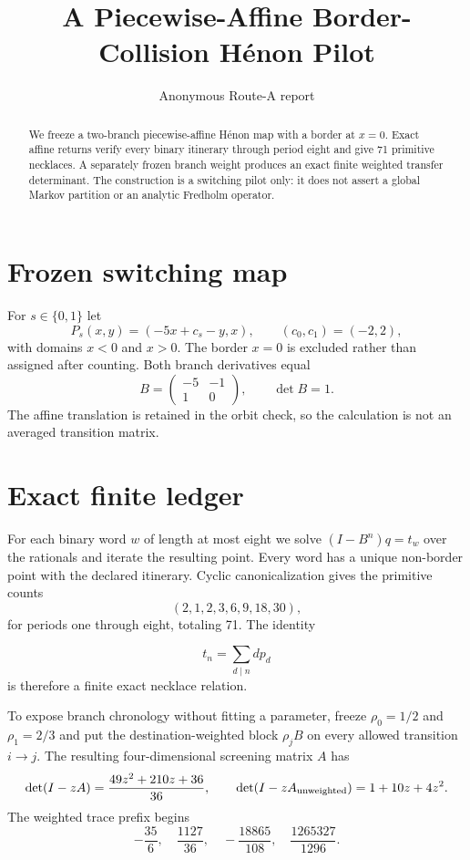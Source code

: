 \documentclass[10pt]{article}
\title{A Piecewise-Affine Border-Collision H\'enon Pilot}
\author{Anonymous Route-A report}
\date{}
\begin{document}
\maketitle
\begin{abstract}
We freeze a two-branch piecewise-affine H\'enon map with a border at $x=0$.
Exact affine returns verify every binary itinerary through period eight and
give 71 primitive necklaces.  A separately frozen branch weight produces an
exact finite weighted transfer determinant.  The construction is a switching
pilot only: it does not assert a global Markov partition or an analytic
Fredholm operator.
\end{abstract}

\section{Frozen switching map}
For $s\in\{0,1\}$ let
\[
 P_s(x,y)=(-5x+c_s-y,x),\qquad (c_0,c_1)=(-2,2),
\]
with domains $x<0$ and $x>0$.  The border $x=0$ is excluded rather than
assigned after counting.  Both branch derivatives equal
\[
 B=\begin{pmatrix}-5&-1\\1&0\end{pmatrix},\qquad\det B=1.
\]
The affine translation is retained in the orbit check, so the calculation is
not an averaged transition matrix.

\section{Exact finite ledger}
For each binary word $w$ of length at most eight we solve
$(I-B^n)q=t_w$ over the rationals and iterate the resulting point.  Every
word has a unique non-border point with the declared itinerary.  Cyclic
canonicalization gives the primitive counts
\[
 (2,1,2,3,6,9,18,30),
\]
for periods one through eight, totaling 71.  The identity

\[
 t_n=\sum_{d\mid n}d p_d
\]
is therefore a finite exact necklace relation.

To expose branch chronology without fitting a parameter, freeze
$\rho_0=1/2$ and $\rho_1=2/3$ and put the destination-weighted block $\rho_jB$
on every allowed transition $i\to j$.  The resulting four-dimensional
screening matrix $A$ has
\[
 \det(I-zA)=\frac{49z^2+210z+36}{36},
 \qquad \det(I-zA_{\rm unweighted})=1+10z+4z^2.
\]
The weighted trace prefix begins
\[
 -\frac{35}{6},\quad \frac{1127}{36},\quad -\frac{18865}{108},\quad
 \frac{1265327}{1296}.
\]
\end{document}
